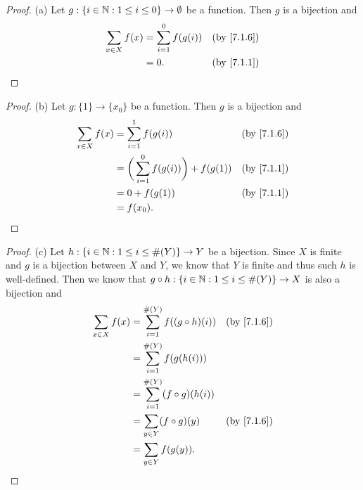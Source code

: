 \begin{proof}{(a)}
  Let \(g : \{i \in \mathbb{N} : 1 \leq i \leq 0\} \to \emptyset\) be a function.
  Then \(g\) is a bijection and
  \begin{align*}
    \sum_{x \in X} f(x) & = \sum_{i = 1}^0 f(g(i)) &  & \text{(by \cref{7.1.6})} \\
                        & = 0.                     &  & \text{(by \cref{7.1.1})}
  \end{align*}
\end{proof}

\begin{proof}{(b)}
  Let \(g : \{1\} \to \{x_0\}\) be a function.
  Then \(g\) is a bijection and
  \begin{align*}
    \sum_{x \in X} f(x) & = \sum_{i = 1}^1 f(g(i))                       &  & \text{(by \cref{7.1.6})} \\
                        & = \bigg(\sum_{i = 1}^0 f(g(i))\bigg) + f(g(1)) &  & \text{(by \cref{7.1.1})} \\
                        & = 0 + f(g(1))                                  &  & \text{(by \cref{7.1.1})} \\
                        & = f(x_0).
  \end{align*}
\end{proof}

\begin{proof}{(c)}
  Let \(h : \{i \in \mathbb{N} : 1 \leq i \leq \#(Y)\} \to Y\) be a bijection.
  Since \(X\) is finite and \(g\) is a bijection between \(X\) and \(Y\), we know that \(Y\) is finite and thus such \(h\) is well-defined.
  Then we know that \(g \circ h : \{i \in \mathbb{N} : 1 \leq i \leq \#(Y)\} \to X\) is also a bijection and
  \begin{align*}
    \sum_{x \in X} f(x) & = \sum_{i = 1}^{\#(Y)} f((g \circ h)(i)) &  & \text{(by \cref{7.1.6})} \\
                        & = \sum_{i = 1}^{\#(Y)} f(g(h(i)))                                      \\
                        & = \sum_{i = 1}^{\#(Y)} (f \circ g)(h(i))                               \\
                        & = \sum_{y \in Y} (f \circ g)(y)          &  & \text{(by \cref{7.1.6})} \\
                        & = \sum_{y \in Y} f(g(y)).
  \end{align*}
\end{proof}

